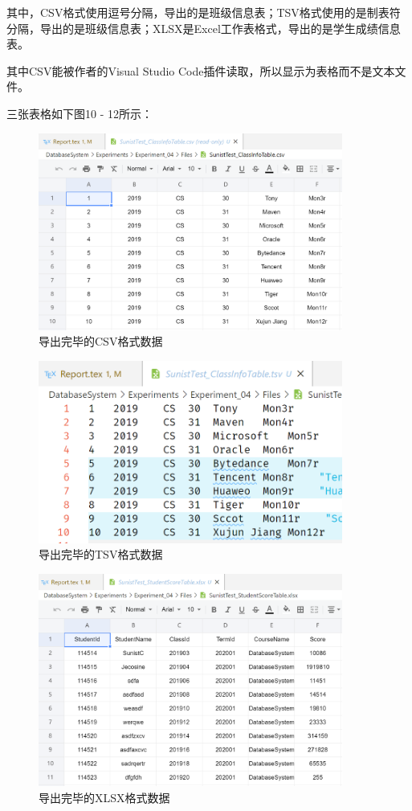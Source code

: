 \documentclass[a4paper,UTF8,heading=false,12pt]{article}
\begin{document}
其中，CSV格式使用逗号分隔，导出的是班级信息表；TSV格式使用的是制表符分隔，导出的是班级信息表；XLSX是Excel工作表格式，导出的是学生成绩信息表。

其中CSV能被作者的Visual Studio Code插件读取，所以显示为表格而不是文本文件。

三张表格如下图10 - 12所示：

\begin{figure}[htbp]
    \centering
    \includegraphics[width=10cm]{../Images/Database_OnExported_CSV.png}
    \caption{导出完毕的CSV格式数据}
\end{figure}

\begin{figure}[htbp]
    \centering
    \includegraphics[width=10cm]{../Images/Database_OnExported_TSV.png}
    \caption{导出完毕的TSV格式数据}
\end{figure}

\begin{figure}[htbp]
    \centering
    \includegraphics[width=10cm]{../Images/Database_OnExported_XLSX.png}
    \caption{导出完毕的XLSX格式数据}
\end{figure}
\end{document}
